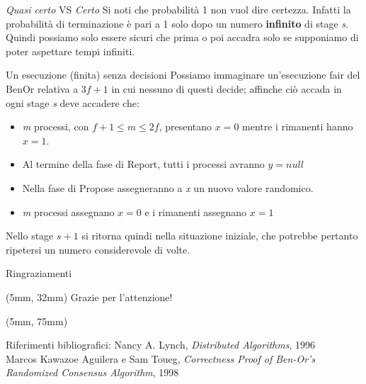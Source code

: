 \documentclass{beamer}
\begin{document}
\begin{frame}{\textit{Quasi certo} VS \textit{Certo}}
    Si noti che probabilità 1 non vuol dire certezza. Infatti la probabilità di terminazione è pari a 1 solo dopo un numero \textbf{infinito} di stage \textit{s}. Quindi possiamo solo essere sicuri che prima o poi accadra solo se supponiamo di poter aspettare tempi infiniti.
    
\end{frame}

\begin{frame}{Un esecuzione (finita) senza decisioni}
    Possiamo immaginare un'esecuzione fair del BenOr relativa a $3f+1$ in cui nessuno di questi decide; affinche ciò accada in ogni stage \textit{s} deve accadere che:
    \begin{itemize}
        \item \textit{m} processi, con $f+1 \leq m \leq 2f$, presentano $x = 0$ mentre i rimanenti hanno $x = 1$.
        \item Al termine della fase di Report, tutti i processi avranno $y = null$ %
        \item Nella fase di Propose assegneranno a \textit{x} un nuovo valore randomico.
        \item \textit{m} processi assegnano $x = 0$ e i rimanenti assegnano $x = 1$
    \end{itemize}
    Nello stage $s + 1$ si ritorna quindi nella situazione iniziale, che potrebbe pertanto ripetersi un numero considerevole di volte.
\end{frame}


{
    \beamertemplatenavigationsymbolsempty
    \begin{frame}{Ringraziamenti}
    \begin{textblock*}{\textwidth}(5mm, 32mm)
        \Huge Grazie per l'attenzione!
    \end{textblock*}
    \begin{textblock*}{0.6\textwidth}(5mm, 75mm)
        \begin{block}{Riferimenti bibliografici:}
            \tiny Nancy A. Lynch, \textit{Distributed Algorithms}, 1996 \\
            Marcos Kawazoe Aguilera e Sam Toueg, \textit{Correctness Proof of Ben-Or’s Randomized Consensus Algorithm}, 1998
        \end{block}
    \end{textblock*}
    \end{frame}
    \addtocounter{framenumber}{-1}
}
\end{document}
